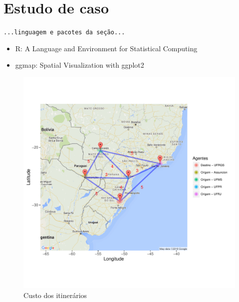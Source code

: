 \documentclass[
	article,			        %
	11pt,				          %
	oneside,			        %
	a4paper,			        %
	english,			        %
	brazil,				        %
	sumario=tradicional
]{abntex2}\usepackage[]{graphicx}\usepackage[]{color}
\makeatletter
\def\maxwidth{ %
  \ifdim\Gin@nat@width>\linewidth
    \linewidth
  \else
    \Gin@nat@width
  \fi
}
\newenvironment{knitrout}{}{} %
\makeatother
\begin{document}
\section{Estudo de caso}

  \texttt{\color{red}...linguagem e pacotes da seção...}
  \begin{itemize}
    \item R: A Language and Environment for Statistical Computing \cite{R.2016}
    \item ggmap: Spatial Visualization with ggplot2 \cite{Kahle.2013}
  \end{itemize}

\begin{knitrout}
\color{fgcolor}\begin{figure}[H]

{\centering \includegraphics[width=\maxwidth]{figure/unnamed-chunk-2-1} 

}

\caption[Custo dos itinerários]{Custo dos itinerários}\label{fig:unnamed-chunk-2}
\end{figure}


\end{knitrout}
\end{document}
